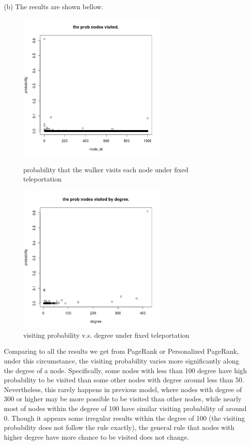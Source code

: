 \documentclass[draftcls,12pt,onecolumn]{IEEEtran}
\begin{document}
(b) The results are shown bellow.
\begin{figure}[htbp]
\centering
\begin{minipage}[t]{0.48\textwidth}
\centering
\includegraphics[width=7.5cm]{4_b_rw_prob.png}
\caption{probability that the walker visits each node under fixed teleportation}
\end{minipage}
\begin{minipage}[t]{0.48\textwidth}
\centering
\includegraphics[width=7.5cm]{4_b_rw_prob_by_degree.png}
\caption{visiting probability v.s. degree under fixed teleportation}
\end{minipage}
\end{figure}
Comparing to all the results we get from PageRank or Personalized PageRank, under this circumstance, the visiting probability varies more significantly along the degree of a node. Specifically, some nodes with less than 100 degree have high probability to be visited than some other nodes with degree around less than 50. Nevertheless, this rarely happens in previous model, where nodes with degree of 300 or higher may be more possible to be visited than other nodes, while nearly most of nodes within the degree of 100 have similar visiting probability of around 0. Though it appears some irregular results within the degree of 100 (the visiting probability does not follow the rule exactly), the general rule that nodes with higher degree have more chance to be visited does not change. 
\end{document}
